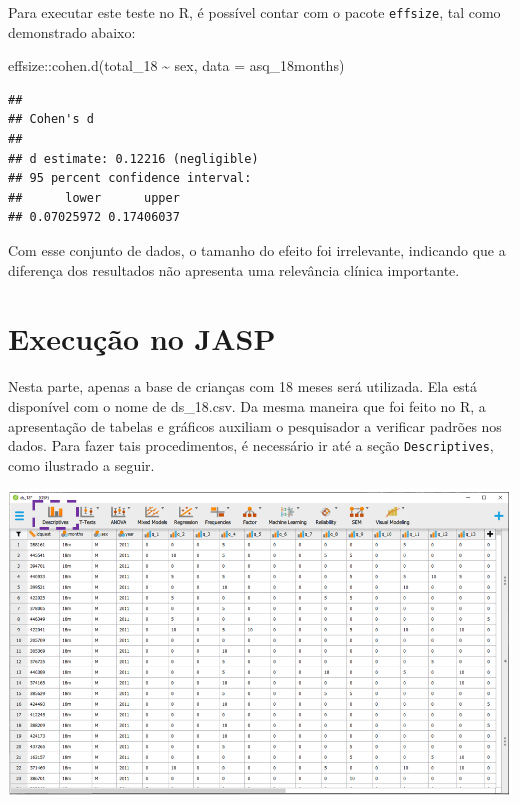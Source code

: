 \documentclass[
]{book}
\newenvironment{Shaded}{\begin{snugshade}}{\end{snugshade}}
\newcommand{\AttributeTok}[1]{\textcolor[rgb]{0.77,0.63,0.00}{#1}}
\newcommand{\FunctionTok}[1]{\textcolor[rgb]{0.00,0.00,0.00}{#1}}
\newcommand{\NormalTok}[1]{#1}
\newcommand{\SpecialCharTok}[1]{\textcolor[rgb]{0.00,0.00,0.00}{#1}}
\begin{document}
Para executar este teste no R, é possível contar com o pacote \texttt{effsize}, tal como demonstrado abaixo:

\begin{Shaded}
\begin{Highlighting}[]
\NormalTok{effsize}\SpecialCharTok{::}\FunctionTok{cohen.d}\NormalTok{(total\_18 }\SpecialCharTok{\textasciitilde{}}\NormalTok{ sex, }\AttributeTok{data =}\NormalTok{ asq\_18months)}
\end{Highlighting}
\end{Shaded}

\begin{verbatim}
## 
## Cohen's d
## 
## d estimate: 0.12216 (negligible)
## 95 percent confidence interval:
##      lower      upper 
## 0.07025972 0.17406037
\end{verbatim}

Com esse conjunto de dados, o tamanho do efeito foi irrelevante, indicando que a diferença dos resultados não apresenta uma relevância clínica importante.

\hypertarget{execuuxe7uxe3o-no-jasp-3}{%
\section{Execução no JASP}\label{execuuxe7uxe3o-no-jasp-3}}

Nesta parte, apenas a base de crianças com 18 meses será utilizada. Ela está disponível com o nome de ds\_18.csv. Da mesma maneira que foi feito no R, a apresentação de tabelas e gráficos auxiliam o pesquisador a verificar padrões nos dados. Para fazer tais procedimentos, é necessário ir até a seção \texttt{Descriptives}, como ilustrado a seguir.

\includegraphics{./img/jasp_descriptives.png}
\end{document}
